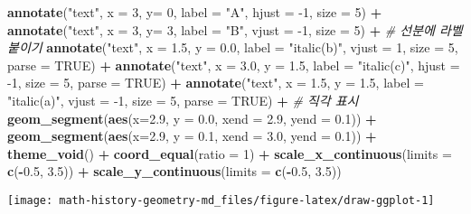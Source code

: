 \documentclass[
]{article}
\newenvironment{Shaded}{\begin{snugshade}}{\end{snugshade}}
\newcommand{\CommentTok}[1]{\textcolor[rgb]{0.56,0.35,0.01}{\textit{#1}}}
\newcommand{\DataTypeTok}[1]{\textcolor[rgb]{0.13,0.29,0.53}{#1}}
\newcommand{\DecValTok}[1]{\textcolor[rgb]{0.00,0.00,0.81}{#1}}
\newcommand{\FloatTok}[1]{\textcolor[rgb]{0.00,0.00,0.81}{#1}}
\newcommand{\KeywordTok}[1]{\textcolor[rgb]{0.13,0.29,0.53}{\textbf{#1}}}
\newcommand{\NormalTok}[1]{#1}
\newcommand{\OperatorTok}[1]{\textcolor[rgb]{0.81,0.36,0.00}{\textbf{#1}}}
\newcommand{\OtherTok}[1]{\textcolor[rgb]{0.56,0.35,0.01}{#1}}
\newcommand{\StringTok}[1]{\textcolor[rgb]{0.31,0.60,0.02}{#1}}
\begin{document}
\begin{Shaded}
\begin{Highlighting}[]
\StringTok{  }\KeywordTok{annotate}\NormalTok{(}\StringTok{"text"}\NormalTok{, }\DataTypeTok{x =} \DecValTok{3}\NormalTok{, }\DataTypeTok{y=} \DecValTok{0}\NormalTok{, }\DataTypeTok{label =} \StringTok{"A"}\NormalTok{, }\DataTypeTok{hjust =} \DecValTok{{-}1}\NormalTok{, }\DataTypeTok{size =} \DecValTok{5}\NormalTok{) }\OperatorTok{+}
\StringTok{  }\KeywordTok{annotate}\NormalTok{(}\StringTok{"text"}\NormalTok{, }\DataTypeTok{x =} \DecValTok{3}\NormalTok{, }\DataTypeTok{y=} \DecValTok{3}\NormalTok{, }\DataTypeTok{label =} \StringTok{"B"}\NormalTok{, }\DataTypeTok{vjust =} \DecValTok{{-}1}\NormalTok{, }\DataTypeTok{size =} \DecValTok{5}\NormalTok{) }\OperatorTok{+}
\StringTok{  }\CommentTok{\# 선분에 라벨 붙이기}
\StringTok{  }\KeywordTok{annotate}\NormalTok{(}\StringTok{"text"}\NormalTok{, }\DataTypeTok{x =} \FloatTok{1.5}\NormalTok{, }\DataTypeTok{y =} \FloatTok{0.0}\NormalTok{, }\DataTypeTok{label =} \StringTok{"italic(b)"}\NormalTok{, }\DataTypeTok{vjust =}  \DecValTok{1}\NormalTok{, }\DataTypeTok{size =} \DecValTok{5}\NormalTok{, }\DataTypeTok{parse =} \OtherTok{TRUE}\NormalTok{) }\OperatorTok{+}
\StringTok{  }\KeywordTok{annotate}\NormalTok{(}\StringTok{"text"}\NormalTok{, }\DataTypeTok{x =} \FloatTok{3.0}\NormalTok{, }\DataTypeTok{y =} \FloatTok{1.5}\NormalTok{, }\DataTypeTok{label =} \StringTok{"italic(c)"}\NormalTok{, }\DataTypeTok{hjust =} \DecValTok{{-}1}\NormalTok{, }\DataTypeTok{size =} \DecValTok{5}\NormalTok{, }\DataTypeTok{parse =} \OtherTok{TRUE}\NormalTok{) }\OperatorTok{+}
\StringTok{  }\KeywordTok{annotate}\NormalTok{(}\StringTok{"text"}\NormalTok{, }\DataTypeTok{x =} \FloatTok{1.5}\NormalTok{, }\DataTypeTok{y =} \FloatTok{1.5}\NormalTok{, }\DataTypeTok{label =} \StringTok{"italic(a)"}\NormalTok{, }\DataTypeTok{vjust =} \DecValTok{{-}1}\NormalTok{, }\DataTypeTok{size =} \DecValTok{5}\NormalTok{, }\DataTypeTok{parse =} \OtherTok{TRUE}\NormalTok{) }\OperatorTok{+}
\StringTok{  }\CommentTok{\# 직각 표시}
\StringTok{  }\KeywordTok{geom\_segment}\NormalTok{(}\KeywordTok{aes}\NormalTok{(}\DataTypeTok{x=}\FloatTok{2.9}\NormalTok{, }\DataTypeTok{y =} \FloatTok{0.0}\NormalTok{, }\DataTypeTok{xend =} \FloatTok{2.9}\NormalTok{, }\DataTypeTok{yend =} \FloatTok{0.1}\NormalTok{)) }\OperatorTok{+}
\StringTok{  }\KeywordTok{geom\_segment}\NormalTok{(}\KeywordTok{aes}\NormalTok{(}\DataTypeTok{x=}\FloatTok{2.9}\NormalTok{, }\DataTypeTok{y =} \FloatTok{0.1}\NormalTok{, }\DataTypeTok{xend =} \FloatTok{3.0}\NormalTok{, }\DataTypeTok{yend =} \FloatTok{0.1}\NormalTok{)) }\OperatorTok{+}
\StringTok{  }\KeywordTok{theme\_void}\NormalTok{() }\OperatorTok{+}
\StringTok{  }\KeywordTok{coord\_equal}\NormalTok{(}\DataTypeTok{ratio =} \DecValTok{1}\NormalTok{) }\OperatorTok{+}
\StringTok{  }\KeywordTok{scale\_x\_continuous}\NormalTok{(}\DataTypeTok{limits =} \KeywordTok{c}\NormalTok{(}\OperatorTok{{-}}\FloatTok{0.5}\NormalTok{, }\FloatTok{3.5}\NormalTok{)) }\OperatorTok{+}
\StringTok{  }\KeywordTok{scale\_y\_continuous}\NormalTok{(}\DataTypeTok{limits =} \KeywordTok{c}\NormalTok{(}\OperatorTok{{-}}\FloatTok{0.5}\NormalTok{, }\FloatTok{3.5}\NormalTok{))}
\end{Highlighting}
\end{Shaded}

\begin{center}\texttt{[image: math-history-geometry-md\_files/figure-latex/draw-ggplot-1]} \end{center}
\end{document}
